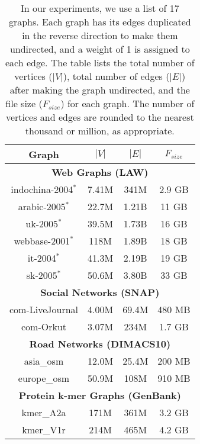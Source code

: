 \begin{table}[!ht]
  \centering
  \caption{In our experiments, we use a list of 17 graphs. Each graph has its edges duplicated in the reverse direction to make them undirected, and a weight of 1 is assigned to each edge. The table lists the total number of vertices ($|V|$), total number of edges ($|E|$) after making the graph undirected, and the file size ($F_{size}$) for each graph. The number of vertices and edges are rounded to the nearest thousand or million, as appropriate.}
  \label{tab:dataset}
  \begin{tabular}{|c||c|c|c|}
    \toprule
    \textbf{Graph} &
    \textbf{\textbf{$|V|$}} &
    \textbf{\textbf{$|E|$}} &
    \textbf{\textbf{$F_{size}$}} \\
    \midrule
    \multicolumn{4}{|c|}{\textbf{Web Graphs (LAW)}} \\ \hline
    indochina-2004$^*$ & 7.41M & 341M & 2.9 GB \\ \hline
    arabic-2005$^*$ & 22.7M & 1.21B & 11 GB \\ \hline
    uk-2005$^*$ & 39.5M & 1.73B & 16 GB \\ \hline
    webbase-2001$^*$ & 118M & 1.89B & 18 GB \\ \hline
    it-2004$^*$ & 41.3M & 2.19B & 19 GB \\ \hline
    sk-2005$^*$ & 50.6M & 3.80B & 33 GB \\ \hline
    \multicolumn{4}{|c|}{\textbf{Social Networks (SNAP)}} \\ \hline
    com-LiveJournal & 4.00M & 69.4M & 480 MB \\ \hline
    com-Orkut & 3.07M & 234M & 1.7 GB \\ \hline
    \multicolumn{4}{|c|}{\textbf{Road Networks (DIMACS10)}} \\ \hline
    asia\_osm & 12.0M & 25.4M & 200 MB \\ \hline
    europe\_osm & 50.9M & 108M & 910 MB \\ \hline
    \multicolumn{4}{|c|}{\textbf{Protein k-mer Graphs (GenBank)}} \\ \hline
    kmer\_A2a & 171M & 361M & 3.2 GB \\ \hline
    kmer\_V1r & 214M & 465M & 4.2 GB \\ \hline
  \bottomrule
  \end{tabular}
  \end{table}
